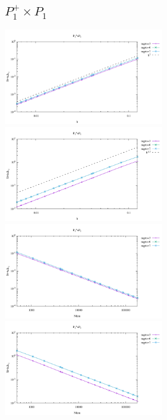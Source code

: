 \subsection*{$P_1^+\times P_1$}
\begin{center}
\includegraphics[width=7cm]{python_codes/fieldstone_120/results/P1+P1-velocity-h.pdf}
\includegraphics[width=7cm]{python_codes/fieldstone_120/results/P1+P1-pressure-h.pdf}
\includegraphics[width=7cm]{python_codes/fieldstone_120/results/P1+P1-velocity-Nfem.pdf}
\includegraphics[width=7cm]{python_codes/fieldstone_120/results/P1+P1-pressure-Nfem.pdf}
\end{center}

